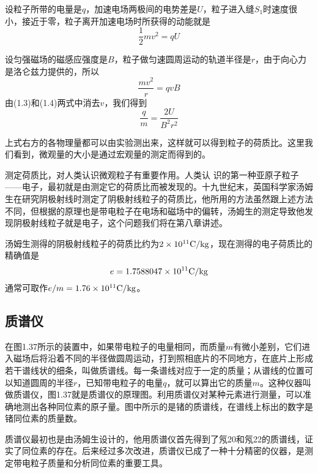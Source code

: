 设粒子所带的电量是$q$，加速电场两极间的电势差是$U$，粒子进入缝$S_1$时速度很小，接近于零，粒子离开加速电场时所获得的动能就是
\begin{equation}
\frac{1}{2}mv^2=qU    
\end{equation}

设匀强磁场的磁感应强度是$B$，粒子做匀速圆周运动的轨道半径是$r$，由于向心力是洛仑兹力提供的，所以
\begin{equation}
    \frac{mv^2}{r}=qvB
\end{equation}
由(1.3)和(1.4)两式中消去$v$，我们得到
\[\frac{q}{m}=\frac{2U}{B^2r^2}\]

上式右方的各物理量都可以由实验测出来，这样就可以得到粒子的荷质比。这里我们看到，微观量的大小是通过宏观量的测定而得到的。

测定荷质比，对人类认识微观粒子有重要作用。人类认
识的第一种亚原子粒子——电子，最初就是由测定它的荷质比而被发现的。十九世纪末，英国科学家汤姆生在研究阴极射线时测定了阴极射线粒子的荷质比，他所用的方法虽然跟上述方法不同，但根据的原理也是带电粒子在电场和磁场中的偏转，汤姆生的测定导致他发现阴极射线粒子就是电子，这个问题我们将在第八章讲述。

汤姆生测得的阴极射线粒子的荷质比约为$2\times10^{11}{\rm C}/{\rm kg}$，现在测得的电子荷质比的精确值是
\[e=1.7588047\times10^{11}{\rm C}/{\rm kg}\]
通常可取作$e/m=1.76\times10^{11}{\rm C}/{\rm kg}$。

\subsection{质谱仪}

在图1.37所示的装置中，如果带电粒子的电量相同，而质量$m$有微小差别，它们进入磁场后将沿着不同的半径做圆周运动，打到照相底片的不同地方，在底片上形成若干谱线状的细条，叫做质谱线。每一条谱线对应于一定的质量；从谱线的位置可以知道圆周的半径$r$，已知带电粒子的电量$q$，就可以算出它的质量$m$。这种仪器叫做质谱仪，图1.37就是质谱仪的原理图。利用质谱仪对某种元素进行测量，可以准确地测出各种同位素的原子量。图中所示的是锗的质谱线，在谱线上标出的数字是锗同位素的质量数。

质谱仪最初也是由汤姆生设计的，他用质谱仪首先得到了氖20和氖22的质谱线，证实了同位素的存在。后来经过多次改进，质谱仪已成了一种十分精密的仪器，是测定带电粒子质量和分析同位素的重要工具。


